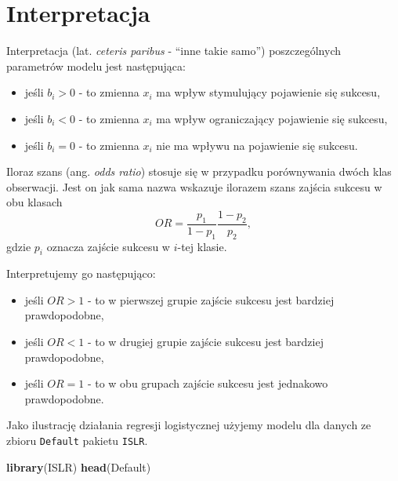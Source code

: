\documentclass[
]{book}
\newenvironment{Shaded}{\begin{snugshade}}{\end{snugshade}}
\newcommand{\KeywordTok}[1]{\textcolor[rgb]{0.13,0.29,0.53}{\textbf{#1}}}
\newcommand{\NormalTok}[1]{#1}
\providecommand{\tightlist}{%
  \setlength{\itemsep}{0pt}\setlength{\parskip}{0pt}}
\theoremstyle{plain}
\theoremstyle{definition}
\theoremstyle{definition}
\theoremstyle{definition}
\theoremstyle{definition}
\theoremstyle{remark}
\let\BeginKnitrBlock\begin \let\EndKnitrBlock\end
\begin{document}
\hypertarget{interpretacja}{%
\section{Interpretacja}\label{interpretacja}}

Interpretacja (lat. \emph{ceteris paribus} - ``inne takie samo'') poszczególnych parametrów modelu jest następująca:

\begin{itemize}
\tightlist
\item
  jeśli \(b_i>0\) - to zmienna \(x_i\) ma wpływ stymulujący pojawienie się sukcesu,
\item
  jeśli \(b_i<0\) - to zmienna \(x_i\) ma wpływ ograniczający pojawienie się sukcesu,
\item
  jeśli \(b_i=0\) - to zmienna \(x_i\) nie ma wpływu na pojawienie się sukcesu.
\end{itemize}

Iloraz szans (ang. \emph{odds ratio}) stosuje się w przypadku porównywania dwóch klas obserwacji. Jest on jak sama nazwa wskazuje ilorazem szans zajścia sukcesu w obu klasach
\begin{equation}
    OR = \frac{p_1}{1-p_1}\frac{1-p_2}{p_2},
\end{equation}
gdzie \(p_i\) oznacza zajście sukcesu w \(i\)-tej klasie.

Interpretujemy go następująco:

\begin{itemize}
\tightlist
\item
  jeśli \(OR>1\) - to w pierwszej grupie zajście sukcesu jest bardziej prawdopodobne,
\item
  jeśli \(OR<1\) - to w drugiej grupie zajście sukcesu jest bardziej prawdopodobne,
\item
  jeśli \(OR=1\) - to w obu grupach zajście sukcesu jest jednakowo prawdopodobne.
\end{itemize}

\BeginKnitrBlock{example}
\protect\hypertarget{exm:logit}{}{\label{exm:logit} }Jako ilustrację działania regresji logistycznej użyjemy modelu dla danych ze zbioru \texttt{Default} pakietu \texttt{ISLR}.
\EndKnitrBlock{example}

\begin{Shaded}
\begin{Highlighting}[]
\KeywordTok{library}\NormalTok{(ISLR)}
\KeywordTok{head}\NormalTok{(Default)}
\end{Highlighting}
\end{Shaded}
\end{document}
